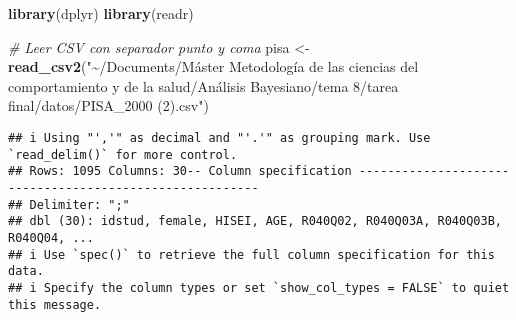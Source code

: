 \documentclass[
]{article}
\newenvironment{Shaded}{\begin{snugshade}}{\end{snugshade}}
\newcommand{\CommentTok}[1]{\textcolor[rgb]{0.56,0.35,0.01}{\textit{#1}}}
\newcommand{\FunctionTok}[1]{\textcolor[rgb]{0.13,0.29,0.53}{\textbf{#1}}}
\newcommand{\NormalTok}[1]{#1}
\newcommand{\OtherTok}[1]{\textcolor[rgb]{0.56,0.35,0.01}{#1}}
\newcommand{\StringTok}[1]{\textcolor[rgb]{0.31,0.60,0.02}{#1}}
\begin{document}
\begin{Shaded}
\begin{Highlighting}[]
\FunctionTok{library}\NormalTok{(dplyr)}
\FunctionTok{library}\NormalTok{(readr)}

\CommentTok{\# Leer CSV con separador punto y coma}
\NormalTok{pisa }\OtherTok{\textless{}{-}} \FunctionTok{read\_csv2}\NormalTok{(}\StringTok{"\textasciitilde{}/Documents/Máster Metodología de las ciencias del comportamiento y de la salud/Análisis Bayesiano/tema 8/tarea final/datos/PISA\_2000 (2).csv"}\NormalTok{)}
\end{Highlighting}
\end{Shaded}

\begin{verbatim}
## i Using "','" as decimal and "'.'" as grouping mark. Use `read_delim()` for more control.
## Rows: 1095 Columns: 30-- Column specification --------------------------------------------------------
## Delimiter: ";"
## dbl (30): idstud, female, HISEI, AGE, R040Q02, R040Q03A, R040Q03B, R040Q04, ...
## i Use `spec()` to retrieve the full column specification for this data.
## i Specify the column types or set `show_col_types = FALSE` to quiet this message.
\end{verbatim}
\end{document}
